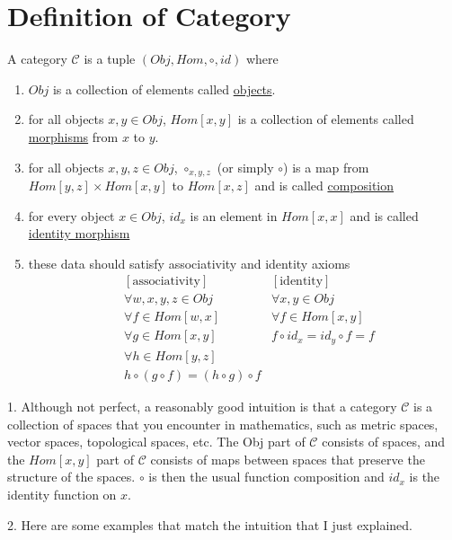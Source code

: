 \documentclass{report}[12pt]
\begin{document}
\section{Definition of Category}
\begin{definition}
  A category $\mathcal{C}$ is a tuple $(Obj, Hom, \circ, id)$ where
  \begin{enumerate}
    \item $Obj$ is a collection of elements called \underline{objects}.
    \item for all objects $x, y \in Obj$, $Hom[x, y]$ is a collection of elements called \underline{morphisms} from $x$ to $y$.
    \item for all objects $x, y, z \in Obj$, $\circ_{x, y, z}$ (or simply $\circ$) is a map from $Hom[y, z]\times Hom[x, y]$ to $Hom[x, z]$ and is called \underline{composition}
    \item for every object $x\in Obj$, $id_x$ is an element in $Hom[x, x]$ and is called \underline{identity morphism}
    \item these data should satisfy associativity and identity axioms
    \begin{align*}
      &[\text{associativity}] &[\text{identity}] \\
      &\forall w, x, y, z \in Obj &\forall x, y \in Obj\\
      &\forall f \in Hom[w, x] &\forall f \in Hom[x, y] \\
      &\forall g \in Hom[x, y] &f \circ id_x = id_y \circ f = f\\
      &\forall h \in Hom[y, z] &\\
      &h \circ (g \circ f) = (h \circ g) \circ f &
    \end{align*}
  \end{enumerate}
\end{definition}
1. Although not perfect, a reasonably good intuition is that a category $\mathcal{C}$ is a collection of spaces that you encounter in mathematics, such as metric spaces, vector spaces, topological spaces, etc. The Obj part of $\mathcal{C}$ consists of spaces, and the $Hom[x, y]$ part of $\mathcal{C}$ consists of maps between spaces that preserve the structure of the spaces. $\circ$ is then the usual function composition and $id_x$ is the identity function on $x$.

2. Here are some examples that match the intuition that I just explained.
\end{document}

